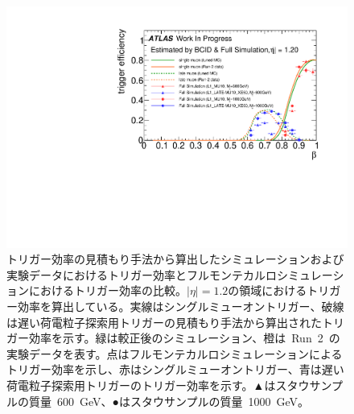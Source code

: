\begin{figure}[H]
    \centering   
    \includegraphics[width=\textwidth,page=1]{img/rec/tunetune.pdf}
    \caption[トリガー効率の見積もり手法から算出したシミュレーションおよび実験データにおけるトリガー効率とフルモンテカルロシミュレーションにおけるトリガー効率の比較]{トリガー効率の見積もり手法から算出したシミュレーションおよび実験データにおけるトリガー効率とフルモンテカルロシミュレーションにおけるトリガー効率の比較。$|\eta|=1.2$の領域におけるトリガー効率を算出している。実線はシングルミューオントリガー、破線は遅い荷電粒子探索用トリガーの見積もり手法から算出されたトリガー効率を示す。緑は較正後のシミュレーション、橙は~Run~2~の実験データを表す。点はフルモンテカルロシミュレーションによるトリガー効率を示し、赤はシングルミューオントリガー、青は遅い荷電粒子探索用トリガーのトリガー効率を示す。▲はスタウサンプルの質量~600~GeV、●はスタウサンプルの質量~1000~GeV。}\label{fig:rectritune}
\end{figure}
